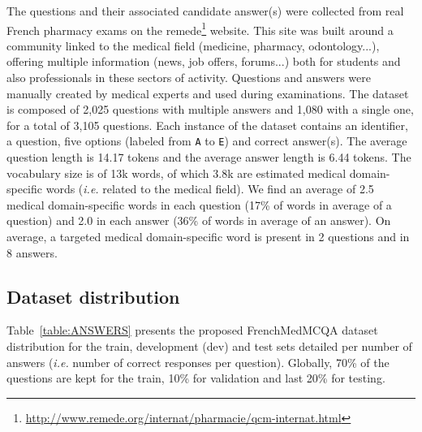 \documentclass[11pt]{article}
\begin{document}
The questions and their associated candidate answer(s) were collected from real French pharmacy exams on the remede\footnote{\url{http://www.remede.org/internat/pharmacie/qcm-internat.html}} website. This site was built around a community linked to the medical field (medicine, pharmacy, odontology...), offering multiple information (news, job offers, forums...) both for students and also professionals in these sectors of activity. Questions and answers were manually created by medical experts and used during  examinations. The dataset is composed of 2,025 questions with multiple answers and 1,080 with a single one, for a total of 3,105 questions. Each instance of the dataset contains an identifier, a question, five options (labeled from \texttt{A} to \texttt{E}) and correct answer(s). The average question length is 14.17 tokens and the average answer length is 6.44 tokens. The vocabulary size is of 13k words, of which 3.8k are estimated medical domain-specific words ({\it i.e.} related to the medical field). We find an average of 2.5 medical domain-specific words in each question (17\% of words in average of a question) and 2.0 in each answer (36\% of words in average of an answer). On average, a targeted medical domain-specific word is present in 2 questions and in 8 answers.



\subsection{Dataset distribution}

Table~\ref{table:ANSWERS} presents the proposed FrenchMedMCQA dataset distribution for the train, development (dev) and test sets  detailed per number of answers ({\it i.e.} number of correct responses per question). Globally, 70\% of the questions are kept for the train, 10\% for validation and last 20\% for testing.
\end{document}
